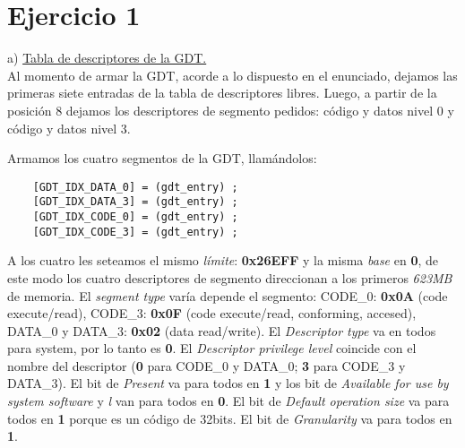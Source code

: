 \documentclass[a4paper]{article}
\begin{document}
\thispagestyle{empty}

 


\maketitle
\newpage


\newpage


\newpage
\section{Ejercicio 1}
{\large a)} \underline{Tabla de descriptores de la GDT.} \\

Al momento de armar la GDT, acorde a lo dispuesto en el enunciado, dejamos las primeras siete entradas de la tabla de descriptores libres. Luego, a partir de la posici\'on 8 dejamos los descriptores de segmento pedidos: c\'odigo y datos nivel 0 y c\'odigo y datos nivel 3.

Armamos los cuatro segmentos de la GDT, llam\'andolos: 
\begin{codesnippet}
\begin{verbatim}
    [GDT_IDX_DATA_0] = (gdt_entry) ;  
    [GDT_IDX_DATA_3] = (gdt_entry) ; 
    [GDT_IDX_CODE_0] = (gdt_entry) ; 
    [GDT_IDX_CODE_3] = (gdt_entry) ; 
\end{verbatim}
\end{codesnippet}

A los cuatro les seteamos el mismo \emph{l\'imite}: \textbf{0x26EFF} y la misma \emph{base} en \textbf{0}, de este modo los cuatro descriptores de segmento direccionan a los primeros \emph{623MB} de memoria. El \emph{segment type} var\'ia depende el segmento: CODE_0: \textbf{0x0A} (code execute/read), CODE_3: \textbf{0x0F} (code execute/read, conforming, accesed), DATA_0 y DATA_3: \textbf{0x02} (data read/write). El \emph{Descriptor type} va en todos para system, por lo tanto es \textbf{0}. El \emph{Descriptor privilege level} coincide con el nombre del descriptor (\textbf{0} para CODE_0 y DATA_0; \textbf{3} para CODE_3 y DATA_3). El bit de \emph{Present} va para todos en \textbf{1} y los bit de \emph{Available for use by system software} y \emph{l} van para todos en \textbf{0}. El bit de \emph{Default operation size} va para todos en \textbf{1} porque es un c\'odigo de 32bits. El bit de \emph{Granularity} va para todos en \textbf{1}.\\
    
\end{document}
